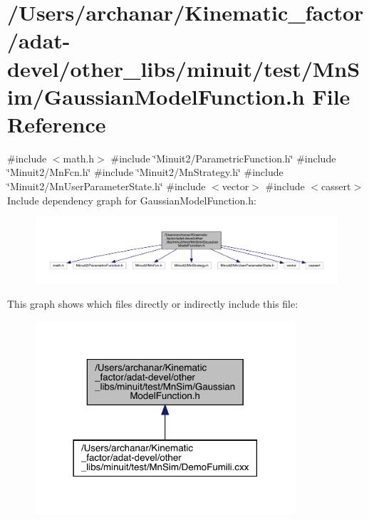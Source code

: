\hypertarget{adat-devel_2other__libs_2minuit_2test_2MnSim_2GaussianModelFunction_8h}{}\section{/\+Users/archanar/\+Kinematic\+\_\+factor/adat-\/devel/other\+\_\+libs/minuit/test/\+Mn\+Sim/\+Gaussian\+Model\+Function.h File Reference}
\label{adat-devel_2other__libs_2minuit_2test_2MnSim_2GaussianModelFunction_8h}
{\ttfamily \#include $<$math.\+h$>$}\newline
{\ttfamily \#include \char`\"{}Minuit2/\+Parametric\+Function.\+h\char`\"{}}\newline
{\ttfamily \#include \char`\"{}Minuit2/\+Mn\+Fcn.\+h\char`\"{}}\newline
{\ttfamily \#include \char`\"{}Minuit2/\+Mn\+Strategy.\+h\char`\"{}}\newline
{\ttfamily \#include \char`\"{}Minuit2/\+Mn\+User\+Parameter\+State.\+h\char`\"{}}\newline
{\ttfamily \#include $<$vector$>$}\newline
{\ttfamily \#include $<$cassert$>$}\newline
Include dependency graph for Gaussian\+Model\+Function.\+h\+:
\nopagebreak
\begin{figure}[H]
\begin{center}
\leavevmode
\includegraphics[width=350pt]{dd/d53/adat-devel_2other__libs_2minuit_2test_2MnSim_2GaussianModelFunction_8h__incl}
\end{center}
\end{figure}
This graph shows which files directly or indirectly include this file\+:
\nopagebreak
\begin{figure}[H]
\begin{center}
\leavevmode
\includegraphics[width=273pt]{d3/d4c/adat-devel_2other__libs_2minuit_2test_2MnSim_2GaussianModelFunction_8h__dep__incl}
\end{center}
\end{figure}
